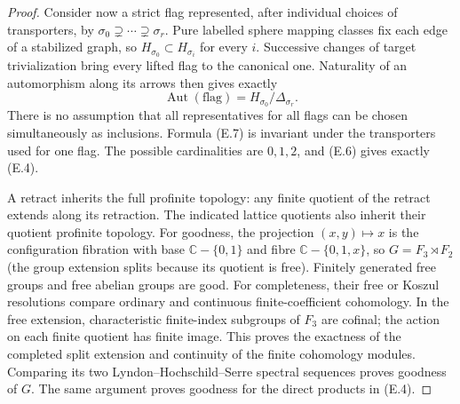\begin{proof}
Consider now a strict flag represented, after individual choices of
transporters, by
$\sigma_0\supsetneq\cdots\supsetneq\sigma_r$.
Pure labelled sphere mapping classes fix each edge of a stabilized
graph, so $H_{\sigma_0}\subset H_{\sigma_i}$ for every $i$.
Successive changes of target trivialization bring every lifted flag to
the canonical one.  Naturality of an automorphism along its arrows
then gives exactly
\[
             \operatorname{Aut}(\text{flag})
                =H_{\sigma_0}/\Delta_{\sigma_r}.             \tag{E.7}
\]
There is no assumption that all representatives for all flags can be
chosen simultaneously as inclusions.  Formula (E.7) is invariant under
the transporters used for one flag.  The possible cardinalities are
$0,1,2$, and (E.6) gives exactly (E.4).

A retract inherits the full profinite topology: any finite quotient of
the retract extends along its retraction.  The indicated lattice
quotients also inherit their quotient profinite topology.  For goodness,
the projection $(x,y)\mapsto x$ is the configuration fibration with
base $\mathbb C-\{0,1\}$ and fibre
$\mathbb C-\{0,1,x\}$, so
$G=F_3\rtimes F_2$ (the group extension splits because its quotient
is free).  Finitely generated free groups and free abelian groups are
good.  For completeness, their free or Koszul resolutions compare
ordinary and continuous finite-coefficient cohomology.  In the free
extension, characteristic finite-index subgroups of $F_3$ are cofinal;
the action on each finite quotient has finite image.  This proves the
exactness of the completed split extension and continuity of the
finite cohomology modules.  Comparing its two Lyndon--Hochschild--Serre
spectral sequences proves goodness of $G$.  The same argument proves
goodness for the direct products in (E.4).
\end{proof}

